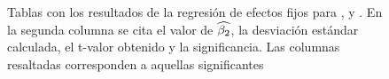 \begin{figure}[ht]
\centering


\caption{Tablas con los resultados de la regresión de efectos fijos para \ENGMAX, \FOMEAN y \NOISETOHARMONICS. En la segunda columna se cita el valor de $\widehat{\beta_2}$, la desviación estándar calculada, el t-valor obtenido y la significancia. Las columnas resaltadas corresponden a aquellas significantes}\label{regresion_efectos_fijos_tabla}

\end{figure}

